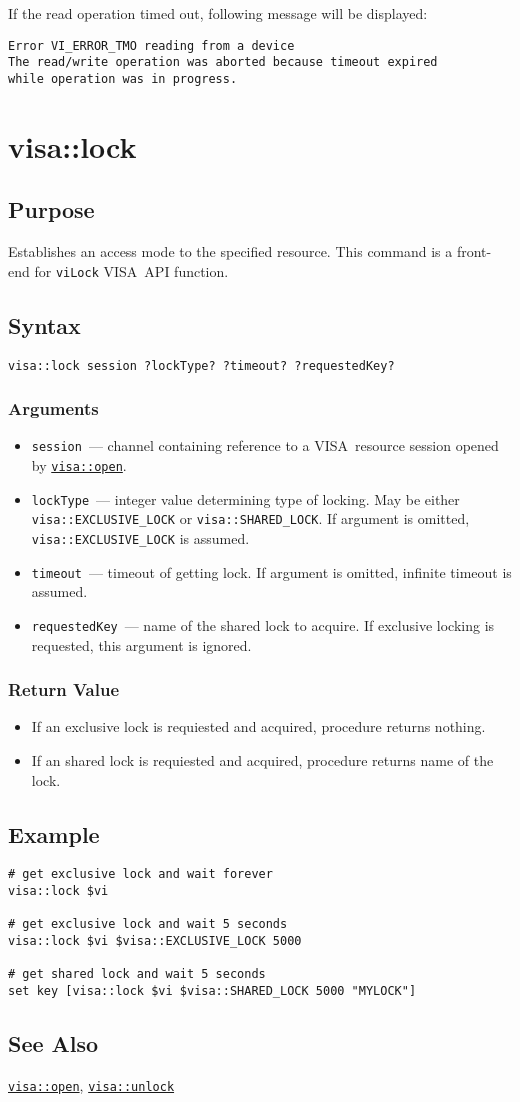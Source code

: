 \documentclass[12pt, a4paper]{report}
\newcommand{\VISA}{\mbox{VISA }}
\newcommand{\COMMANDREF}[1]{{\tt \hyperref[#1]{#1}}}
\newcommand{\VISACOMMANDREF}[1]{{\tt \mbox{#1}}\index{#1}}
\newcommand{\SEEALSO}{\subsection*{See Also}}
\newcommand{\EXAMPLE}{\subsection*{Example}}
\newcommand{\PURPOSE}{\subsection*{Purpose}}
\newcommand{\SYNTAX}[1]{\subsection*{Syntax}{\tt #1}}
\newcommand{\ARGUMENTS}{\subsubsection*{Arguments}}
\newcommand{\RETURN}{\subsubsection*{Return Value}}
\newcommand{\COMMAND}[1]{\section{#1}\label{#1}}
\newcommand{\BEGINARGUMENTS}{\ARGUMENTS\begin{itemize}}
\newcommand{\ENDARGUMENTS}{\end{itemize}}
\newcommand{\ARGUMENT}[1]{\item {\tt \mbox{#1}}~---}
\newcommand{\ARGCHANNEL}{\ARGUMENT{session} channel containing reference to a \VISA resource session opened by \COMMANDREF{visa::open}.}
\begin{document}
If the read operation timed out, following message will be displayed:

\begin{verbatim} 
Error VI_ERROR_TMO reading from a device
The read/write operation was aborted because timeout expired 
while operation was in progress.
\end{verbatim} 


\COMMAND{visa::lock}

\PURPOSE

Establishes an access mode to the specified resource. This command is a front-end for \VISACOMMANDREF{viLock} \VISA API function.

\SYNTAX{visa::lock session ?lockType? ?timeout? ?requestedKey?}

\BEGINARGUMENTS
\ARGCHANNEL
\ARGUMENT{lockType} integer value determining type of locking. May be either {\tt visa::EXCLUSIVE\_LOCK} or {\tt visa::SHARED\_LOCK}. If argument is omitted, {\tt visa::EXCLUSIVE\_LOCK} is assumed.
\ARGUMENT{timeout} timeout of getting lock. If argument is omitted, infinite timeout is assumed.
\ARGUMENT{requestedKey} name of the shared lock to acquire. If exclusive locking is requested, this argument is ignored.
\ENDARGUMENTS

\RETURN

\begin{itemize}
\item If an exclusive lock is requiested and acquired, procedure returns nothing.
\item If an shared lock is requiested and acquired, procedure returns name of the lock.
\end{itemize}

\EXAMPLE

\begin{verbatim} 
# get exclusive lock and wait forever
visa::lock $vi

# get exclusive lock and wait 5 seconds
visa::lock $vi $visa::EXCLUSIVE_LOCK 5000

# get shared lock and wait 5 seconds
set key [visa::lock $vi $visa::SHARED_LOCK 5000 "MYLOCK"]
\end{verbatim} 

\SEEALSO

\COMMANDREF{visa::open}, \COMMANDREF{visa::unlock}

\end{document}
